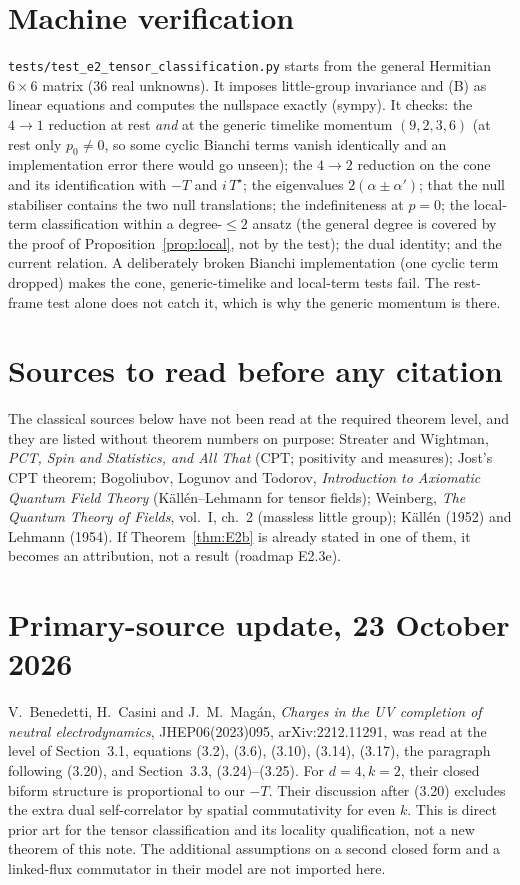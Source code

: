 \documentclass[11pt]{article}
\theoremstyle{remark}
\newcommand{\Tt}{T}
\newcommand{\dual}{{\star}}
\begin{document}
\section{Machine verification}\label{sec:verification}

\texttt{tests/test\_e2\_tensor\_classification.py} starts from the general
Hermitian $6\times6$ matrix (36 real unknowns). It imposes little-group
invariance and (B) as linear equations and computes the nullspace exactly
(sympy). It checks:
the $4\to1$ reduction at rest \emph{and} at the generic timelike momentum
$(9,2,3,6)$ (at rest only $p_0\neq0$, so some cyclic Bianchi terms vanish
identically and an implementation error there would go unseen);
the $4\to2$ reduction on the cone and its identification with $-\Tt$ and
$i\,\Tt^{\dual}$; the eigenvalues $2(\alpha\pm\alpha')$; that the null
stabiliser contains the two null translations; the indefiniteness at $p=0$;
the local-term classification within a degree-$\le2$ ansatz (the general
degree is covered by the proof of Proposition~\ref{prop:local}, not by the
test); the dual identity;
and the current relation. A deliberately broken Bianchi implementation (one
cyclic term dropped) makes the cone, generic-timelike and local-term tests
fail. The rest-frame test alone does not catch it, which is why the generic
momentum is there.

\section*{Sources to read before any citation}
The classical sources below have not been read at the required theorem level,
and they are listed without
theorem numbers on purpose: Streater and Wightman, \emph{PCT, Spin and
Statistics, and All That} (CPT; positivity and measures); Jost's CPT theorem;
Bogoliubov, Logunov and Todorov, \emph{Introduction to Axiomatic Quantum Field
Theory} (K\"all\'en--Lehmann for tensor fields); Weinberg, \emph{The Quantum
Theory of Fields}, vol.~I, ch.~2 (massless little group); K\"all\'en (1952)
and Lehmann (1954). If Theorem~\ref{thm:E2b} is already stated in one of them,
it becomes an attribution, not a result (roadmap E2.3e).

\section*{Primary-source update, 23 October 2026}
V.~Benedetti, H.~Casini and J.~M.~Mag\'an,
\emph{Charges in the UV completion of neutral electrodynamics},
JHEP06(2023)095, arXiv:2212.11291, was read at the level of
Section~3.1, equations (3.2), (3.6), (3.10), (3.14), (3.17),
the paragraph following (3.20), and Section~3.3, (3.24)--(3.25).
For $d=4,k=2$, their closed biform structure is proportional to our $-\Tt$.
Their discussion after (3.20) excludes the extra dual self-correlator
by spatial commutativity for even $k$. This is direct prior art for the
tensor classification and its locality qualification, not a new theorem
of this note. The additional assumptions on a second closed form and a
linked-flux commutator in their model are not imported here.
\end{document}

